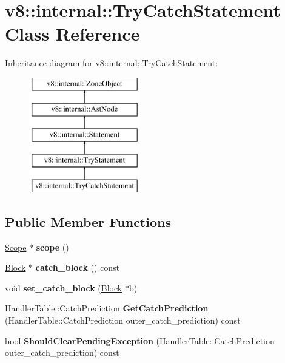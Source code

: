 \hypertarget{classv8_1_1internal_1_1TryCatchStatement}{}\section{v8\+:\+:internal\+:\+:Try\+Catch\+Statement Class Reference}
\label{classv8_1_1internal_1_1TryCatchStatement}
Inheritance diagram for v8\+:\+:internal\+:\+:Try\+Catch\+Statement\+:\begin{figure}[H]
\begin{center}
\leavevmode
\includegraphics[height=5.000000cm]{classv8_1_1internal_1_1TryCatchStatement}
\end{center}
\end{figure}
\subsection*{Public Member Functions}
\begin{DoxyCompactItemize}
\item 
\mbox{\label{classv8_1_1internal_1_1TryCatchStatement_a73367297151c26a8c9d3e7d5068f4352}} 
\mbox{\hyperlink{classv8_1_1internal_1_1Scope}{Scope}} $\ast$ {\bfseries scope} ()
\item 
\mbox{\label{classv8_1_1internal_1_1TryCatchStatement_a3655c66de14fbfd7bd69cae27aa874a8}} 
\mbox{\hyperlink{classv8_1_1internal_1_1Block}{Block}} $\ast$ {\bfseries catch\+\_\+block} () const
\item 
\mbox{\label{classv8_1_1internal_1_1TryCatchStatement_a41a650282b7d4661e973fd94f728702f}} 
void {\bfseries set\+\_\+catch\+\_\+block} (\mbox{\hyperlink{classv8_1_1internal_1_1Block}{Block}} $\ast$b)
\item 
\mbox{\label{classv8_1_1internal_1_1TryCatchStatement_a657eb5768a2f05c309328390a3d7ed17}} 
Handler\+Table\+::\+Catch\+Prediction {\bfseries Get\+Catch\+Prediction} (Handler\+Table\+::\+Catch\+Prediction outer\+\_\+catch\+\_\+prediction) const
\item 
\mbox{\label{classv8_1_1internal_1_1TryCatchStatement_a4addeed7aaf66a1a0c26ae3d9eee23c6}} 
\mbox{\hyperlink{classbool}{bool}} {\bfseries Should\+Clear\+Pending\+Exception} (Handler\+Table\+::\+Catch\+Prediction outer\+\_\+catch\+\_\+prediction) const
\end{DoxyCompactItemize}
